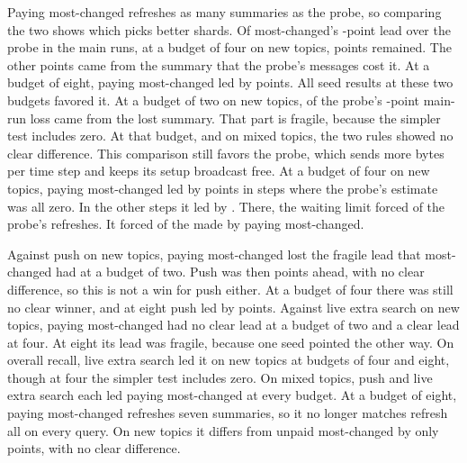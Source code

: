Paying most-changed refreshes as many summaries as the probe, so comparing the two shows which picks better shards.
Of most-changed's \RNumPlainHThreeBRNMinusDCNewTopic{}-point lead over the probe in the main runs, at a budget of four on new topics, \RNumPlainXOneRNBFourNewTopic{} points remained.
The other \RNumPlainXThreeDCBFourNewTopic{} points came from the summary that the probe's messages cost it.
At a budget of eight, paying most-changed led by \RNumPlainXOneRNBEightNewTopic{} points.
All \RNumAddThreeXOnePosSeedsBFourBEight{} seed results at these two budgets favored it.
At a budget of two on new topics, \RNumPlainXThreeDCBTwoNewTopic{} of the probe's \RNumPlainRNLossBTwoNewTopic{}-point main-run loss came from the lost summary.
That part is fragile, because the simpler test includes zero.
At that budget, and on mixed topics, the two rules showed no clear difference.
This comparison still favors the probe, which sends \RNumAddThreeRNExtraEpochBytesVsChargedDC{} more bytes per time step and keeps its setup broadcast free.
At a budget of four on new topics, paying most-changed led by \RNumPlainXOneAllZeroGap{} points in steps where the probe's estimate was all zero.
In the other steps it led by \RNumPlainXOneNonZeroGap{}.
There, the waiting limit forced \RNumAddThreeRNForcedSumBFourNewTopic{} of the probe's \RNumAddThreeTotalRefreshesBFour{} refreshes.
It forced \RNumAddThreeChargedDCForcedSumBFourNewTopic{} of the \RNumAddThreeTotalRefreshesBFour{} made by paying most-changed.

Against push on new topics, paying most-changed lost the fragile lead that most-changed had at a budget of two.
Push was then \RNumPlainXTwoPVBTwoNewTopic{} points ahead, with no clear difference, so this is not a win for push either.
At a budget of four there was still no clear winner, and at eight push led by \RNumPlainXTwoPVBEightNewTopic{} points.
Against live extra search on new topics, paying most-changed had no clear lead at a budget of two and a clear lead at four.
At eight its lead was fragile, because one seed pointed the other way.
On overall recall, live extra search led it on new topics at budgets of four and eight, though at four the simpler test includes zero.
On mixed topics, push and live extra search each led paying most-changed at every budget.
At a budget of eight, paying most-changed refreshes seven summaries, so it no longer matches refresh all on every query.
On new topics it differs from unpaid most-changed by only \RNumPlainXThreeDCBEightNewTopic{} points, with no clear difference.

